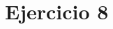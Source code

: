 \documentclass[../../labo_tp5_main.tex]{subfiles}
\begin{document}
\section{Ejercicio 8}
\end{document}
